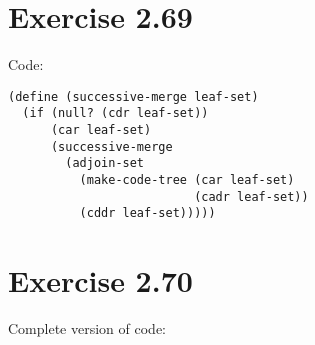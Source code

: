 \documentclass[../main.tex]{subfiles}
\begin{document}
\section{Exercise 2.69}

Code:

\begin{lstlisting}
(define (successive-merge leaf-set)
  (if (null? (cdr leaf-set))
      (car leaf-set)
      (successive-merge
        (adjoin-set
          (make-code-tree (car leaf-set)
                          (cadr leaf-set))
          (cddr leaf-set)))))
\end{lstlisting}

\section{Exercise 2.70}

Complete version of code:
\end{document}
